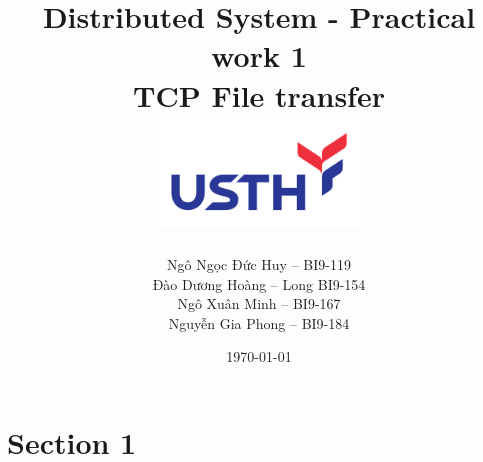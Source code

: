 \documentclass{article}
\begin{document}
\begin{titlepage}
	\title{
		\Large{Distributed System - Practical work 1} \\
		\Huge{\textbf{TCP File transfer}} \\
		\includegraphics[width=0.4\textwidth]{logo-usth-pa3-01.png}
	}
	\author{
		 Ngô Ngọc Đức Huy -- BI9-119 \\
		 Đào Dương Hoàng -- Long BI9-154 \\
		 Ngô Xuân Minh -- BI9-167 \\
		 Nguyễn Gia Phong -- BI9-184
	}
	\date{\today}
\end{titlepage}

\maketitle

\section{Section 1}
\end{document}
